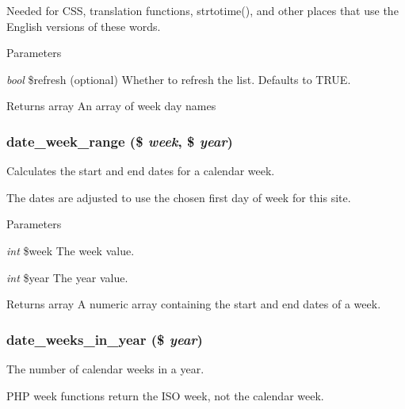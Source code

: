 Needed for CSS, translation functions, strtotime(), and other places that use the English versions of these words.


\begin{DoxyParams}{Parameters}
\item[{\em bool}]\$refresh (optional) Whether to refresh the list. Defaults to TRUE.\end{DoxyParams}
\begin{DoxyReturn}{Returns}
array An array of week day names 
\end{DoxyReturn}
\hypertarget{date__api_8module_a2616fe3c5af3b92fecfbc2c6240cf804}{
\subsubsection[{date\_\-week\_\-range}]{\setlength{\rightskip}{0pt plus 5cm}date\_\-week\_\-range (\$ {\em week}, \/  \$ {\em year})}}
\label{date__api_8module_a2616fe3c5af3b92fecfbc2c6240cf804}
Calculates the start and end dates for a calendar week.

The dates are adjusted to use the chosen first day of week for this site.


\begin{DoxyParams}{Parameters}
\item[{\em int}]\$week The week value. \item[{\em int}]\$year The year value.\end{DoxyParams}
\begin{DoxyReturn}{Returns}
array A numeric array containing the start and end dates of a week. 
\end{DoxyReturn}
\hypertarget{date__api_8module_a44b370ef2cba956130ea77bccb231ac5}{
\subsubsection[{date\_\-weeks\_\-in\_\-year}]{\setlength{\rightskip}{0pt plus 5cm}date\_\-weeks\_\-in\_\-year (\$ {\em year})}}
\label{date__api_8module_a44b370ef2cba956130ea77bccb231ac5}
The number of calendar weeks in a year.

PHP week functions return the ISO week, not the calendar week.



